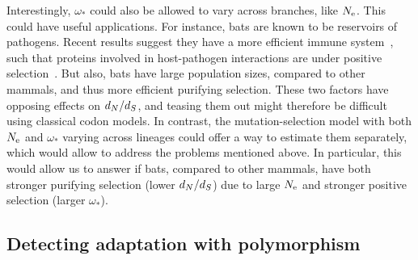 Interestingly, $\omega_*$ could also be allowed to vary across branches, like $N_{\text{e}}$.
This could have useful applications.
For instance, bats are known to be reservoirs of pathogens.
Recent results suggest they have a more efficient immune system~\citep{Baker2013,Pavlovich2018}, such that proteins involved in host-pathogen interactions are under positive selection~\citep{Hawkins2019,Vandewege2020}.
But also, bats have large population sizes, compared to other mammals, and thus more efficient purifying selection.
These two factors have opposing effects on $d_N / d_S$, and teasing them out might therefore be difficult using classical \gls{codon} models.
In contrast, the mutation-selection model with both $N_{\text{e}}$ and $\omega_*$ varying across lineages could offer a way to estimate them separately, which would allow to address the problems mentioned above.
In particular, this would allow us to answer if bats, compared to other mammals, have both stronger purifying selection (lower $d_N / d_S$) due to large $N_{\text{e}}$ and stronger positive selection (larger $\omega_*$).

\subsection{Detecting adaptation with polymorphism}
\label{subsec:detecting-adaptation-with-polymorphism}

